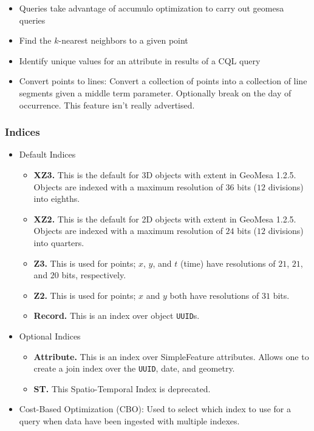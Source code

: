 \begin{itemize}
{\begin{itemize}
{  }
  \item Queries take advantage of accumulo optimization to carry out geomesa queries
  \item Find the $k$-nearest neighbors to a given point
  \item Identify unique values for an attribute in results of a CQL query
  \item{
    Convert points to lines: Convert a collection of points into a collection of line segments given a middle term parameter.
    Optionally break on the day of occurrence. This feature isn't really advertised.
  }
  \end{itemize}
}
\end{itemize}

  
\subsubsection*{Indices}

\begin{itemize}
\item{Default Indices
  \begin{itemize}
  \item{
    {\bf XZ3.}
    This is the default for 3D objects with extent in GeoMesa 1.2.5.
    Objects are indexed with a maximum resolution of $36$ bits ($12$ divisions) into eighths.
  }
  \item{
    {\bf XZ2.}
    This is the default for 2D objects with extent in GeoMesa 1.2.5.
    Objects are indexed with a maximum resolution of $24$ bits ($12$ divisions) into quarters.
  }
  \item{
    {\bf Z3.}
    This is used for points; $x$, $y$, and $t$ (time) have resolutions of $21$, $21$, and $20$ bits, respectively.
  }
  \item{
    {\bf Z2.}
    This is used for points; $x$ and $y$ both have resolutions of $31$ bits.
  }
  \item{
    {\bf Record.}
    This is an index over object \texttt{UUID}s.
  }
  \end{itemize}
}
\item{Optional Indices
  \begin{itemize}
  \item{
    {\bf Attribute.}
    This is an index over SimpleFeature attributes.
    Allows one to create a join index over the \texttt{UUID}, date, and geometry.
  }
  \item{{\bf ST.}  This Spatio-Temporal Index is deprecated.}
  \end{itemize}
}
\item Cost-Based Optimization (CBO): Used to select which index to use for a query when data have been ingested with multiple indexes.
\end{itemize}


